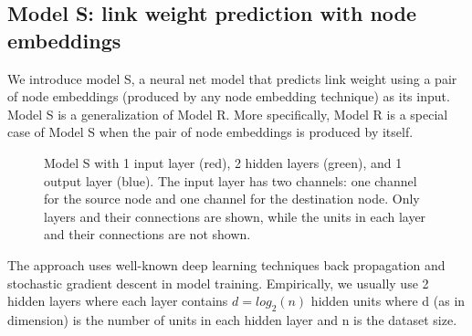 \documentclass{article} %
\begin{document}
\subsection{Model S: link weight prediction with node embeddings}
We introduce model S, a neural net model that predicts link weight using a pair of node embeddings (produced by any node embedding technique) as its input.
Model S is a generalization of Model R. More specifically, Model R is a special case of Model S when the pair of node embeddings is produced by itself.
\begin{figure}[h]\centering
	\newcommand{\layersep}{1cm}
	\caption{
		Model S with 1 input layer (red), 2 hidden layers (green), and 1 output layer (blue).
		The input layer has two channels: one channel for the source node and one channel for the destination node.
		Only layers and their connections are shown,
		while the units in each layer and their connections are not shown.
	}
	\label{fig:model-s}
\end{figure}

The approach uses well-known deep learning techniques back propagation \citep{rumelhart1988learning} and stochastic gradient descent \citep{lecun2012efficient} in model training.
Empirically, we usually use 2 hidden layers where each layer contains $ d = log_2(n) $ hidden units where d (as in dimension) is the number of units in each hidden layer and n is the dataset size.
\end{document}
